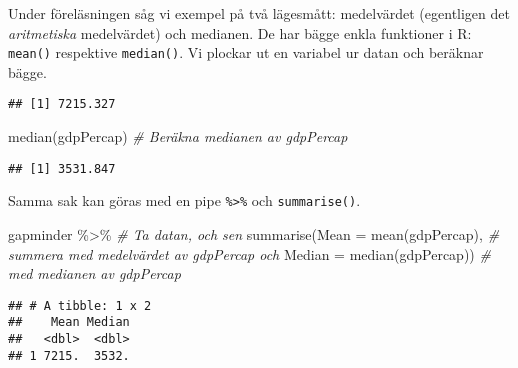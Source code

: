 \documentclass[
]{book}
\newenvironment{Shaded}{\begin{snugshade}}{\end{snugshade}}
\newcommand{\AttributeTok}[1]{\textcolor[rgb]{0.77,0.63,0.00}{#1}}
\newcommand{\CommentTok}[1]{\textcolor[rgb]{0.56,0.35,0.01}{\textit{#1}}}
\newcommand{\FunctionTok}[1]{\textcolor[rgb]{0.00,0.00,0.00}{#1}}
\newcommand{\NormalTok}[1]{#1}
\newcommand{\OtherTok}[1]{\textcolor[rgb]{0.56,0.35,0.01}{#1}}
\newcommand{\SpecialCharTok}[1]{\textcolor[rgb]{0.00,0.00,0.00}{#1}}
\theoremstyle{definition}
\theoremstyle{definition}
\theoremstyle{definition}
\theoremstyle{definition}
\theoremstyle{remark}
\begin{document}
Under föreläsningen såg vi exempel på två lägesmått: medelvärdet (egentligen det \emph{aritmetiska} medelvärdet) och medianen. De har bägge enkla funktioner i R: \texttt{mean()} respektive \texttt{median()}. Vi plockar ut en variabel ur datan och beräknar bägge.

\begin{Shaded}
\end{Shaded}

\begin{verbatim}
## [1] 7215.327
\end{verbatim}

\begin{Shaded}
\begin{Highlighting}[]
\FunctionTok{median}\NormalTok{(gdpPercap)                      }\CommentTok{\# Beräkna medianen av gdpPercap}
\end{Highlighting}
\end{Shaded}

\begin{verbatim}
## [1] 3531.847
\end{verbatim}

Samma sak kan göras med en pipe \texttt{\%\textgreater{}\%} och \texttt{summarise()}.

\begin{Shaded}
\begin{Highlighting}[]
\NormalTok{gapminder }\SpecialCharTok{\%\textgreater{}\%}                                    \CommentTok{\# Ta datan, och sen}
  \FunctionTok{summarise}\NormalTok{(}\AttributeTok{Mean =} \FunctionTok{mean}\NormalTok{(gdpPercap),              }\CommentTok{\# summera med medelvärdet av gdpPercap och}
            \AttributeTok{Median =} \FunctionTok{median}\NormalTok{(gdpPercap))          }\CommentTok{\# med medianen av gdpPercap}
\end{Highlighting}
\end{Shaded}

\begin{verbatim}
## # A tibble: 1 x 2
##    Mean Median
##   <dbl>  <dbl>
## 1 7215.  3532.
\end{verbatim}
\end{document}
